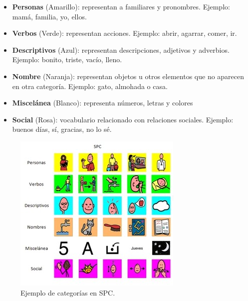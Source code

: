 \begin{itemize}
	\item \textbf{Personas} (Amarillo): representan a familiares y pronombres. Ejemplo: mamá, familia,  yo, ellos.
	\item \textbf{Verbos} (Verde): representan acciones. Ejemplo: abrir, agarrar, comer, ir.
	\item \textbf{Descriptivos} (Azul): representan descripciones, adjetivos y adverbios. Ejemplo: bonito, triste, vacío, lleno.
	\item \textbf{Nombre} (Naranja): representan objetos u otros elementos que no aparecen en otra categoría. Ejemplo: gato, almohada o casa.
	\item \textbf{Miscelánea} (Blanco): representa números, letras y colores
	\item \textbf{Social} (Rosa): vocabulario relacionado con relaciones sociales. Ejemplo: buenos días, sí, gracias, no lo sé.
	
\end{itemize}

\begin{figure}[h!]
	\centering
	\includegraphics[width=0.7\linewidth]{Imagenes/Bitmap/SPCcolores}
	\caption{Ejemplo de categorías en SPC.}
	\label{fig:spccolores}
\end{figure}

